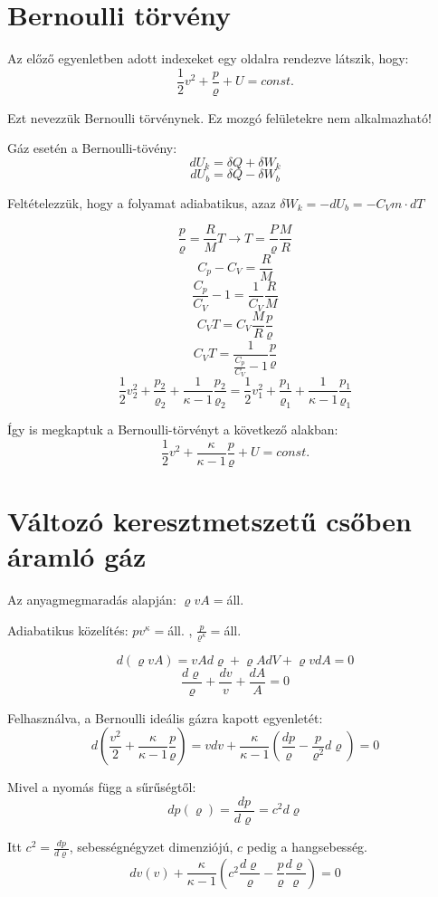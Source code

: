 \documentclass[a4paper,titlepage,12pt]{article}
\begin{document}
\part*{Bernoulli törvény}

Az előző egyenletben adott indexeket egy oldalra rendezve látszik, hogy: $$\frac{1}{2}v^{2}+\frac{p}{\varrho}+U=const.$$

Ezt nevezzük Bernoulli törvénynek. Ez mozgó felületekre nem alkalmazható!

Gáz esetén a Bernoulli-tövény: $$dU_{k}=\delta Q+\delta W_{k}$$ $$dU_{b}=\delta Q-\delta W_{b} $$

Feltételezzük, hogy a folyamat adiabatikus, azaz $\delta W_{k}=-dU_{b}=-C_{V}m \cdot dT$

$$\frac{p}{\varrho}=\frac{R}{M}T\longrightarrow T=\frac{P}{\varrho}\frac{M}{R}$$
$$ C_{p}-C_{V}=\frac{R}{M} $$  $$\frac{C_{p}}{C_{V}}-1=\frac{1}{C_{V}}\frac{R}{M} $$ $$C_{V}T=C_{V}\frac{M}{R}\frac{p}{\varrho} $$ $$ C_{V}T=\frac{1}{\frac{C_{p}}{C_{V}}-1}\frac{p}{\varrho} $$ $$\frac{1}{2}v_{2}^{2}+\frac{p_{2}}{\varrho_{2}}+\frac{1}{\kappa-1}\frac{p_{2}}{\varrho_{2}}=\frac{1}{2}v_{1}^{2}+\frac{p_{1}}{\varrho_{1}}+\frac{1}{\kappa-1}\frac{p_{1}}{\varrho_{1}} $$

Így is megkaptuk a Bernoulli-törvényt a következő alakban: $$\frac{1}{2}v^{2}+\frac{\kappa}{\kappa-1}\frac{p}{\varrho}+U=const. $$

\part*{Változó keresztmetszetű csőben áramló gáz}

Az anyagmegmaradás alapján: $\varrho vA=$áll.

Adiabatikus közelítés: $pv^{\kappa}=$áll. , $\frac{p}{\varrho^{\kappa}}=$áll.

$$d(\varrho vA)=vAd\varrho+\varrho AdV+\varrho vdA=0 $$
$$\frac{d\varrho}{\varrho}+\frac{dv}{v}+\frac{dA}{A}=0 $$

Felhasználva, a Bernoulli ideális gázra kapott egyenletét: $$d(\frac{v^{2}}{2}+\frac{\kappa}{\kappa-1}\frac{p}{\varrho})=vdv+\frac{\kappa}{\kappa-1}(\frac{dp}{\varrho}-\frac{p}{\varrho^{2}}d\varrho)=0 $$

Mivel a nyomás függ a sűrűségtől: $$dp(\varrho)=\frac{dp}{d\varrho}=c^{2}d\varrho$$

Itt $c^{2}=\frac{dp}{d\varrho}$, sebességnégyzet dimenziójú, $c$ pedig a hangsebesség. $$dv(v)+\frac{\kappa}{\kappa-1}(c^{2}\frac{d\varrho}{\varrho}-\frac{p}{\varrho}\frac{d\varrho}{\varrho})=0$$
\end{document}

